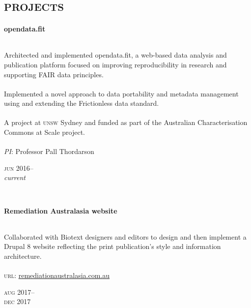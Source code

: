 
\vspace{-0.6cm}
\section*{\textsc{projects}}
\vspace{-0.2cm}

\begin{minipage}[t]{\mainboxwidth\textwidth}
\textbf{opendata.fit}\\
{\small
\\
Architected and implemented opendata.fit, a web-based data analysis and publication platform focused on improving reproducibility in research and supporting FAIR data principles.\\
\\
Implemented a novel approach to data portability and metadata management using and extending the Frictionless data standard.\\
\\
A project at \textsc{unsw} Sydney and funded as part of the Australian Characterisation Commons at Scale project.\\
\\
\textit{PI}: Professor Pall Thordarson\\
\par}
\end{minipage}
\begin{minipage}[t]{\detailboxwidth\textwidth}
{
\hfill \textsc{jun} 2016--\\ 
\hspace*{0pt} \hfill \textit{\small current}
\par
}
\end{minipage}
\\


\begin{minipage}[t]{\mainboxwidth\textwidth}
\textbf{Remediation Australasia website}\\
{\small
\\
Collaborated with Biotext designers and editors to design and then implement a Drupal 8 website reflecting
the print publication's style and information architecture. \\
\\
\textsc{url}: \href{https://www.remediationaustralasia.com.au/}{remediationaustralasia.com.au} 
\par
}
\end{minipage}
\begin{minipage}[t]{\detailboxwidth\textwidth}
{
\hfill \textsc{aug} 2017--\\ 
\hspace*{0pt} \hfill \textsc{dec} 2017
\par
}
\end{minipage}
\\

